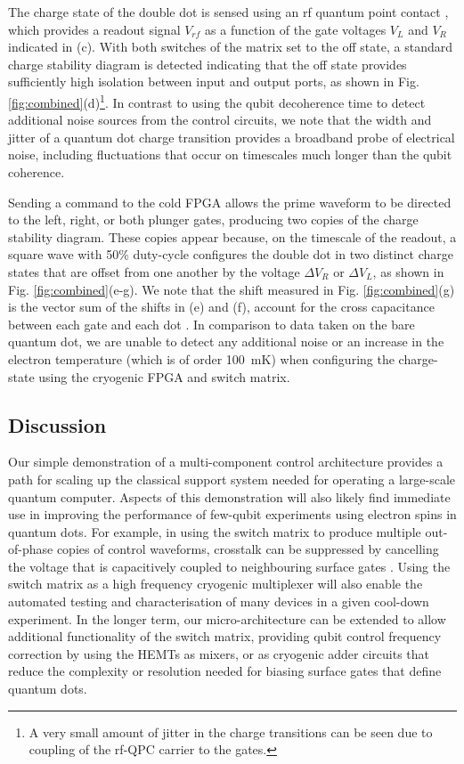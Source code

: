 The charge state of the double dot is sensed using an rf quantum point contact \cite{Reilly:2007ig,doi:10.1063/1.4868107}, which provides a readout signal $V_{rf}$ as a function of the gate voltages $V_L$ and $V_R$ indicated in (c). With both switches of the matrix set to the off state, a standard charge stability diagram is detected indicating that the off state provides sufficiently high isolation between input and output ports, as shown in Fig. \ref{fig:combined}(d)\footnote{A very small amount of jitter in the charge transitions can be seen due to coupling of the rf-QPC carrier to the gates.}. In contrast to using the qubit decoherence time to detect additional noise sources from the control circuits, we note that the width and jitter of a quantum dot charge transition provides a broadband probe of electrical noise, including fluctuations that occur on timescales much longer than the qubit coherence.

Sending a command to the cold FPGA allows the prime waveform to be directed to the left, right, or both plunger gates, producing two copies of the charge stability diagram. These copies appear because, on the timescale of the readout, a square wave with 50\% duty-cycle configures the double dot in two distinct charge states that are offset from one another by the voltage $\Delta V_R$ or $\Delta V_L$, as shown in Fig. \ref{fig:combined}(e-g).  We note that the shift measured in Fig. \ref{fig:combined}(g) is the vector sum of the shifts in (e) and (f), account for the cross capacitance between each gate and each dot \cite{PhysRevB.72.161301}.  In comparison to data taken on the bare quantum dot, we are unable to detect any additional noise or an increase in the electron temperature (which is of order \SI{100}{\milli\kelvin}) when configuring the charge-state using the cryogenic FPGA and switch matrix.

\subsection{Discussion}
Our simple demonstration of a multi-component control architecture provides a path for scaling up the classical support system needed for operating a large-scale quantum computer. Aspects of this demonstration will also likely find immediate use in improving the performance of few-qubit experiments using electron spins in quantum dots. For example, in using the switch matrix to produce multiple out-of-phase copies of control waveforms, crosstalk can be suppressed by cancelling the voltage that is capacitively coupled to neighbouring surface gates \cite{doi:10.1063/1.4752863}. Using the switch matrix as a high frequency cryogenic multiplexer will also enable the automated testing and characterisation of many devices in a given cool-down experiment. In the longer term, our micro-architecture can be extended to allow additional functionality of the switch matrix, providing qubit control frequency correction by using the HEMTs as mixers, or as cryogenic adder circuits that reduce the complexity or resolution needed for biasing surface gates that define quantum dots.


